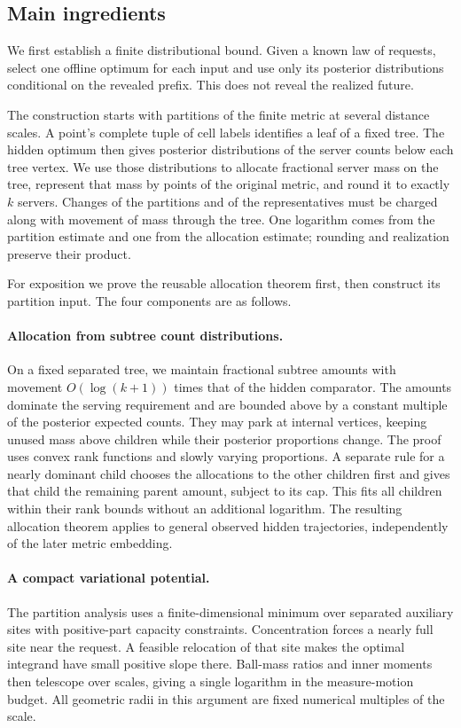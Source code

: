 \subsection{Main ingredients}

We first establish a finite distributional bound. Given a known law
of requests, select one offline optimum for each input and use only
its posterior distributions conditional on the revealed prefix.
This does not reveal the realized future.

The construction starts with partitions of the finite metric at several
distance scales. A point's complete tuple of cell labels identifies a
leaf of a fixed tree. The hidden optimum then gives posterior distributions
of the server counts below each tree vertex. We use those distributions to allocate
fractional server mass on the tree, represent that mass by points of
the original metric, and round it to exactly $k$ servers. Changes of
the partitions and of the representatives must be charged along with
movement of mass through the tree. One logarithm comes from the
partition estimate and one from the allocation estimate; rounding
and realization preserve their product.

For exposition we prove the reusable allocation theorem first, then
construct its partition input. The four components are as follows.

\paragraph{Allocation from subtree count distributions.}
On a fixed separated tree, we maintain fractional subtree amounts
with movement \(O(\log(k+1))\) times that of the hidden comparator.
The amounts dominate the serving requirement and are bounded above
by a constant multiple of the posterior expected counts. They may
park at internal vertices, keeping unused mass above children while
their posterior proportions change. The proof uses convex rank functions
and slowly varying proportions. A separate rule for a nearly dominant
child chooses the allocations to the other children first and gives that child
the remaining parent amount, subject to its cap. This fits all children
within their rank bounds without an additional logarithm.
The resulting allocation theorem applies
to general observed hidden trajectories, independently of the later
metric embedding.

\paragraph{A compact variational potential.}
The partition analysis uses a finite-dimensional minimum over
separated auxiliary sites with positive-part capacity constraints.
Concentration forces a nearly full site near the request.
A feasible relocation of that site makes the optimal integrand
have small positive slope there. Ball-mass ratios and inner
moments then telescope over scales, giving a single logarithm in
the measure-motion budget. All geometric radii in this argument
are fixed numerical multiples of the scale.

